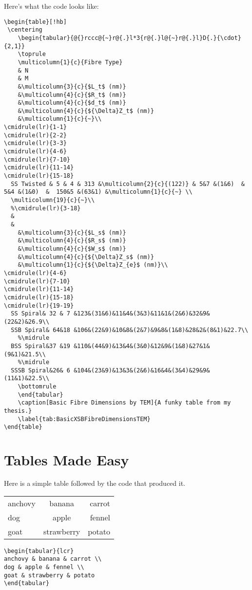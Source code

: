 \pagebreak
Here's what the code looks like:
\begin{verbatim}
\begin{table}[!hb]
 \centering
	\begin{tabular}{@{}rccc@{~}r@{.}l*3{r@{.}l@{~}r@{.}l}D{.}{\cdot}{2,1}}
	\toprule
	\multicolumn{1}{c}{Fibre Type}
	& N 
	& M 
	&\multicolumn{3}{c}{$L_t$ (nm)}
	&\multicolumn{4}{c}{$R_t$ (nm)}
	&\multicolumn{4}{c}{$d_t$ (nm)}
	&\multicolumn{4}{c}{${\Delta}Z_t$ (nm)}
	&\multicolumn{1}{c}{~}\\
\cmidrule(lr){1-1}
\cmidrule(lr){2-2}
\cmidrule(lr){3-3}
\cmidrule(lr){4-6}
\cmidrule(lr){7-10}
\cmidrule(lr){11-14}
\cmidrule(lr){15-18}
  SS Twisted & 5 & 4 & 313 &\multicolumn{2}{c}{(122)} & 5&7 &(1&6)  & 5&4 &(1&0)  &  150&5 &(63&1) &\multicolumn{1}{c}{~} \\
  \multicolumn{19}{c}{~}\\
  %\cmidrule(lr){3-18}
  &
  &
 	&\multicolumn{3}{c}{$L_s$ (nm)} 
 	&\multicolumn{4}{c}{$R_s$ (nm)}
 	&\multicolumn{4}{c}{$W_s$ (nm)}
 	&\multicolumn{4}{c}{${\Delta}Z_s$ (nm)}
 	&\multicolumn{1}{c}{${\Delta}Z_{e}$ (nm)}\\
\cmidrule(lr){4-6}
\cmidrule(lr){7-10}
\cmidrule(lr){11-14}
\cmidrule(lr){15-18}
\cmidrule(lr){19-19}
  SS Spiral& 32 & 7 &123&(31&6)&11&4&(3&3)&11&1&(2&6)&32&9&(22&2)&26.9\\
  SSB Spiral& 64&18 &106&(22&9)&10&8&(2&7)&9&8&(1&8)&28&2&(8&1)&22.7\\
	%\midrule
  BSS Spiral&37 &19 &110&(44&9)&13&4&(3&0)&12&9&(1&8)&27&1&(9&1)&21.5\\
	%\midrule
  SSSB Spiral&26& 6 &104&(23&9)&13&3&(2&6)&16&4&(3&4)&29&9&(11&1)&22.5\\
	\bottomrule
	\end{tabular}	
	\caption[Basic Fibre Dimensions by TEM]{A funky table from my thesis.}
	\label{tab:BasicXSBFibreDimensionsTEM}
\end{table}
\end{verbatim}

\pagebreak

\section{Tables Made Easy}
Here is a simple table followed by the code that produced it.

\begin{center}
\begin{tabular}{lcr}
anchovy & banana & carrot \\
dog & apple & fennel \\
goat & strawberry & potato
\end{tabular}

\vspace*{2ex}

\begin{verbatim}
\begin{tabular}{lcr}
anchovy & banana & carrot \\
dog & apple & fennel \\
goat & strawberry & potato
\end{tabular}
\end{verbatim}
\end{center}

